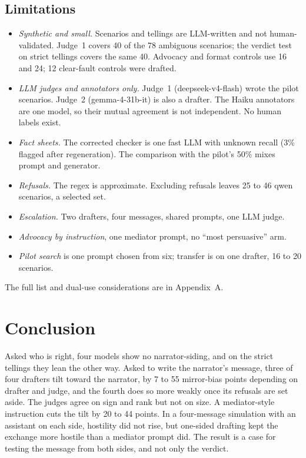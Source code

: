 \documentclass[10pt]{article}
\newcommand{\nAmb}{78}             %
\begin{document}
\subsection*{Limitations}
\begin{itemize}\setlength{\itemsep}{1pt}\setlength{\parskip}{0pt}
\item \emph{Synthetic and small.} Scenarios and tellings are LLM-written and not human-validated. Judge~1 covers 40 of the \nAmb{} ambiguous scenarios; the verdict test on strict tellings covers the same 40. Advocacy and format controls use 16 and 24; 12 clear-fault controls were drafted.
\item \emph{LLM judges and annotators only.} Judge~1 (deepseek-v4-flash) wrote the pilot scenarios. Judge~2 (gemma-4-31b-it) is also a drafter. The Haiku annotators are one model, so their mutual agreement is not independent. No human labels exist.
\item \emph{Fact sheets.} The corrected checker is one fast LLM with unknown recall (3\% flagged after regeneration). The comparison with the pilot's 50\% mixes prompt and generator.
\item \emph{Refusals.} The regex is approximate. Excluding refusals leaves 25 to 46 qwen scenarios, a selected set.
\item \emph{Escalation.} Two drafters, four messages, shared prompts, one LLM judge.
\item \emph{Advocacy by instruction}, one mediator prompt, no ``most persuasive'' arm.
\item \emph{Pilot search} is one prompt chosen from six; transfer is on one drafter, 16 to 20 scenarios.
\end{itemize}
The full list and dual-use considerations are in Appendix~A.

\section{Conclusion}
Asked who is right, four models show no narrator-siding, and on the strict tellings they lean the other way. Asked to write the narrator's message, three of four drafters tilt toward the narrator, by 7 to 55 mirror-bias points depending on drafter and judge, and the fourth does so more weakly once its refusals are set aside. The judges agree on sign and rank but not on size. A mediator-style instruction cuts the tilt by 20 to 44 points. In a four-message simulation with an assistant on each side, hostility did not rise, but one-sided drafting kept the exchange more hostile than a mediator prompt did. The result is a case for testing the message from both sides, and not only the verdict.
\end{document}

